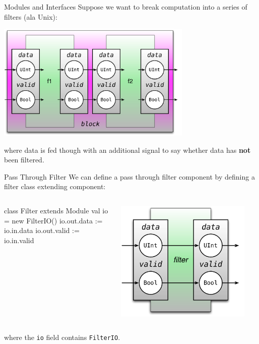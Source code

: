 \documentclass[xcolor=pdflatex,dvipsnames,table]{beamer}
\begin{document}
\begin{frame}[fragile]{Modules and Interfaces}
Suppose we want to break computation into a series of filters (ala Unix):

\begin{center}
\includegraphics[width=0.7\textwidth]{figs/filtering.pdf} 
\end{center}

\noindent 
where data is fed though with an additional  signal to say whether data has \textbf{not} been filtered.

\end{frame}

\begin{frame}[fragile]{Pass Through Filter}
We can define a pass through filter component by defining a filter class extending component:

\begin{columns}

\begin{scala}
class Filter extends Module { 
  val io  = new FilterIO()
  io.out.data  := io.in.data
  io.out.valid := io.in.valid
}
\end{scala}


\begin{center}
\includegraphics[width=0.9\textwidth]{figs/pass-through-filter.pdf} 
\end{center}
\end{columns}

\noindent 
where the \verb+io+ field contains \verb+FilterIO+. 
\end{frame}
\end{document}
